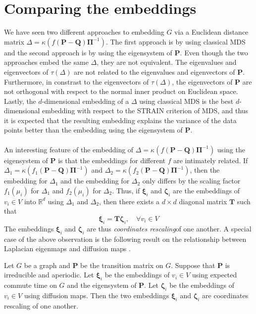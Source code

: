 \section{Comparing the embeddings}
\label{sec:comparing-embeddings}
\noindent
We have seen two different approaches to embedding $G$ via a Euclidean
distance matrix $\Delta = \kappa(f(\mathbf{P} -
\mathbf{Q})\bm{\Pi}^{-1})$. The first approach is by using classical
MDS and the second approach is by using the eigensystem of
$\mathbf{P}$.  Even though the two approaches embed the same $\Delta$,
they are not equivalent. The eigenvalues and eigenvectors of
$\tau(\Delta)$ are not related to the eigenvalues and eigenvectors of
$\mathbf{P}$. Furthermore, in constrast to the eigenvectors of
$\tau(\Delta)$, the eigenvectors of $\mathbf{P}$ are not orthogonal
with respect to the normal inner product on Euclidean space. Lastly,
the $d$-dimensional embedding of a $\Delta$ using classical MDS is the
best $d$-dimensional embedding with respect to the STRAIN criterion of
MDS, and thus it is expected that the resulting embedding explains the
variance of the data points better than the embedding using the
eigensystem of $\mathbf{P}$. \\ \\
\noindent
An interesting feature of the embedding of $\Delta =
\kappa(f(\mathbf{P} - \mathbf{Q})\bm{\Pi}^{-1}) $ using the
eigensystem of $\mathbf{P}$ is that the embeddings for different $f$
are intimately related. If $\Delta_1 = \kappa(f_1(\mathbf{P} -
\mathbf{Q})\bm{\Pi}^{-1})$ and $\Delta_2 = \kappa(f_2(\mathbf{P} -
\mathbf{Q})\bm{\Pi}^{-1})$, then the embedding for $\Delta_1$ and the
embedding for $\Delta_2$ only differs by the scaling factor
$f_1(\mu_i)$ for $\Delta_1$ and $f_2(\mu_i)$ for $\Delta_2$. Thus, if
$\bm{\xi}_i$ and $\bm{\zeta}_i$ are the embeddings of $v_i \in V$ into
$\mathbb{R}^{d}$ using $\Delta_1$ and $\Delta_2$, then there exists a
$d \times d$ diagonal matrix $\mathbf{T}$ such that
\begin{equation}
  \label{eq:123}
  \bm{\xi}_i = \mathbf{T} \bm{\zeta}_i, \quad \forall v_i \in V
\end{equation}
The embeddings $\bm{\xi}_i$ and $\bm{\zeta}_i$ are thus {\em
  coordinates rescaling}\/of one another. A special case of the above
observation is the following result on the relationship between
Laplacian eigenmaps \cite{belkin03:_laplac} and diffusion maps
\cite{coifman06:_diffus_maps}.
\begin{proposition}
  \label{prop:27}
  Let $G$ be a graph and $\mathbf{P}$ be the transition matrix on
  $G$. Suppose that $\mathbf{P}$ is irreducible and aperiodic. Let
  $\bm{\xi}_i$ be the embeddings of $v_i \in V$ using expected commute
  time on $G$ and the eigensystem of $\mathbf{P}$. Let $\bm{\zeta}_i$
  be the embeddings of $v_i \in V$ using diffusion maps. Then the two
  embeddings $\bm{\xi}_i$ and $\bm{\zeta}_i$ are coordinates rescaling
  of one another.
\end{proposition}
